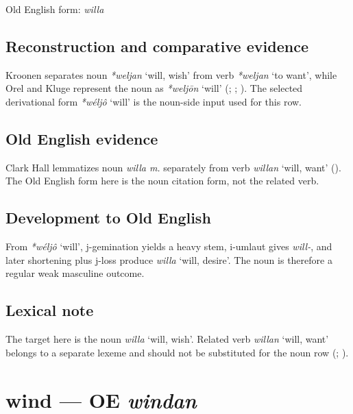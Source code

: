 \documentclass[
  british,
  a4paper,
  openany]{book}
\providecommand{\Recon}[1]{\emph{*#1}}
{\catcode`→=\active \global\def→{\ensuremath{\rightarrow}}}
\providecommand{\texorpdfstring}[2]{#1}
\providecommand{\Recon}[1]{\emph{*#1}}
{\catcode`→=\active \global\def→{\ensuremath{\rightarrow}}}
\begin{document}
Old English form: \emph{willa}

\subsection{Reconstruction and comparative
evidence}\label{reconstruction-and-comparative-evidence-66}

Kroonen separates noun \Recon{weljan} `will, wish' from verb
\Recon{weljan} `to want', while Orel and Kluge represent the noun as
\Recon{weljōn} `will' (;
;
). The selected derivational
form \Recon{wéljô} `will' is the noun-side input used for this row.

\subsection{Old English evidence}\label{old-english-evidence-66}

Clark Hall lemmatizes noun \emph{willa m.} separately from verb
{\emph{willan}} `will, want' (). The Old English form here is the noun citation form, not
the related verb.

\subsection{Development to Old
English}\label{development-to-old-english-66}

From \Recon{wéljô} `will', j-gemination yields a heavy stem, i-umlaut
gives \emph{will-}, and later shortening plus j-loss produce
{\emph{willa}} `will, desire'. The noun is therefore a regular weak
masculine outcome.

\subsection{Lexical note}\label{lexical-note-4}

The target here is the noun \emph{willa} `will, wish'. Related verb
{\emph{willan}} `will, want' belongs to a separate lexeme and should not
be substituted for the noun row (; ).

\section{\texorpdfstring{wind --- OE
\emph{windan}}{wind --- OE windan}}\label{wind-oe-windan}
\end{document}

